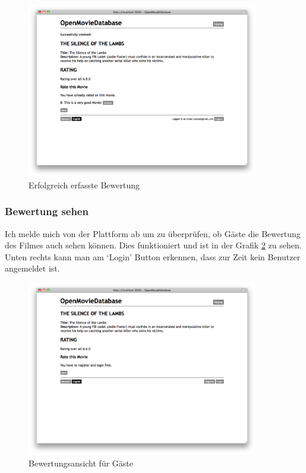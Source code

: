 \begin{figure}[ht]
    \begin{center}
        \includegraphics[width=0.9\textwidth,angle=0]{./bilder/tests/test_bewertung_02.png}
        \caption{Erfolgreich erfasste Bewertung}
        \label{test_bewertung_02}
    \end{center}
\end{figure}

\clearpage

\subsubsection{Bewertung sehen}
Ich melde mich von der Plattform ab um zu überprüfen, ob Gäste die Bewertung
des Filmes auch sehen können. Dies funktioniert und ist in der Grafik \ref{test_bewertung_03}
zu sehen. Unten rechts kann man am `Login' Button erkennen, dass zur Zeit
kein Benutzer angemeldet ist.

\begin{figure}[ht]
    \begin{center}
        \includegraphics[width=0.9\textwidth,angle=0]{./bilder/tests/test_bewertung_03.png}
        \caption{Bewertungsansicht für Gäste}
        \label{test_bewertung_03}
    \end{center}
\end{figure}

